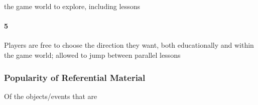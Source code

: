  the game world to explore, including lessons\paragraph{5}Players are free to choose the direction they want, both educationally and within the game world; allowed to jump between parallel lessons\subsubsection{Popularity of Referential Material}Of the objects/events that are